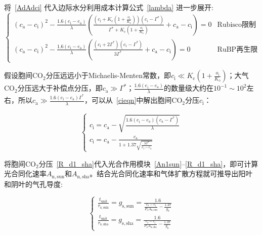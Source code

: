 将~\eqref{AdAdci} 代入边际水分利用成本计算公式~\eqref{lambda} 进一步展开:
\begin{equation}\label{cieqn}
\begin{cases}
    \left(c_{\mathrm{a}}-c_{\mathrm{i}}\right)^2-\frac{1.6\left(e_{\mathrm{i}}-e_{\mathrm{a}}\right)}{\lambda}\left(\frac{\left(c_{\mathrm{i}}+K_{\mathrm{c}}\left(1+\frac{o_{\mathrm{i}}}{K_{\mathrm{o}}}\right)\right)\left(c_i-\Gamma^*\right)}{\Gamma^*+K_{\mathrm{c}}\left(1+\frac{o_{\mathrm{i}}}{K_{\mathrm{o}}}\right)}+c_{\mathrm{a}}-c_{\mathrm{i}}\right)=0 & \text{Rubisco限制}  \\
    \left(c_{\mathrm{a}}-c_{\mathrm{i}}\right)^2-\frac{1.6\left(e_{\mathrm{i}}-e_{\mathrm{a}}\right)}{\lambda}\left(\frac{\left(c_{\mathrm{i}}+2\Gamma^*\right)\left(c_i-\Gamma^*\right)}{3\Gamma^*}+c_{\mathrm{a}}-c_{\mathrm{i}}\right)=0  & \text{RuBP再生限制}
\end{cases}
\end{equation}

假设胞间$\mathrm {CO_2}$分压远远小于Michaelis-Menten常数，即$c_{\mathrm{i}}\ll K_{\mathrm{c}}\left(1+\frac{o_{\mathrm{i}}}{K_{\mathrm{o}}}\right)$；大气$\mathrm {CO_2}$分压远大于补偿点分压，即$c_{\mathrm{a}}\gg\Gamma^*$；$\frac{1.6\left(e_{\mathrm{i}}-e_{\mathrm{a}}\right)}{\lambda}$的数量级大约在$10^{-1}\sim 10^{2}$左右，所以$c_{\mathrm{a}}\gg\frac{1.6\left(e_{\mathrm{i}}-e_{\mathrm{a}}\right)\Gamma^*}{\lambda}$，可以从~\eqref{cieqn}中解出胞间$\mathrm {CO_2}$分压$c_{\mathrm{i}}$：

\begin{equation}\label{cisolu}
    \begin{cases}
    c_{\mathrm{i}}=c_{\mathrm{a}} - \sqrt{\frac{1.6\left(e_{\mathrm{i}}-e_{\mathrm{a}}\right)\left(c_{\mathrm{a}}-\Gamma^*\right)}{\lambda}} \\
    c_{\mathrm{i}}=c_{\mathrm{a}} - \frac{c_{\mathrm{a}}}{1+1.37\sqrt{\frac{\lambda \Gamma^*}{e_{\mathrm{i}}-e_{\mathrm{a}}}}}
    \end{cases}
\end{equation}

将胞间$\mathrm {CO_2}$分压~\eqref{R_d1_sha}代入光合作用模块~\eqref{An1sun}--\eqref{R_d1_sha}，即可计算光合同化速率$A_{\mathrm{n,sun}}$和$A_{\mathrm{n,sha}}$。结合光合同化速率和气体扩散方程就可推导出阳叶和阴叶的气孔导度:

\begin{equation}\label{gssolu}
    \begin{cases}
    \frac{t_{\mathrm{unit}}}{r_{\mathrm{s,sun}}}=g_{\mathrm{s,sun}}=\frac{1.6} {\frac{c_{\mathrm{a}}-c_{\mathrm{i}}}{P_{\mathrm {a}} A_{\mathrm{n,sun}}} - \frac{1.37}{g_{\mathrm{b}}}}\\
    \frac{t_{\mathrm{unit}}}{r_{\mathrm{s,sha}}}=g_{\mathrm{s,sha}}=\frac{1.6} {\frac{c_{\mathrm{a}}-c_{\mathrm{i}}}{P_{\mathrm {a}} A_{\mathrm{n,sha}}} - \frac{1.37}{g_{\mathrm{b}}}}
    \end{cases}
\end{equation}


